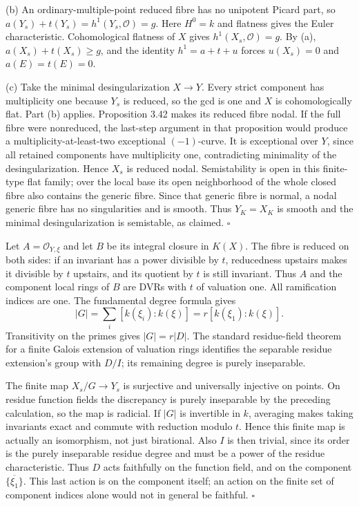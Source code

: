\documentclass[11pt]{article}
\let\chapterexercise\exercise
\renewcommand{\exercise}[2]{\Needspace{8\baselineskip}\chapterexercise{#1}{#2}}
\begin{document}
(b) An ordinary-multiple-point reduced fibre has no unipotent Picard part, so $a(Y_s)+t(Y_s)=h^1(Y_s,\mathcal O)=g$. Here $H^0=k$ and flatness gives the Euler characteristic. Cohomological flatness of $X$ gives $h^1(X_s,\mathcal O)=g$. By (a), $a(X_s)+t(X_s)\ge g$, and the identity $h^1=a+t+u$ forces $u(X_s)=0$ and $a(E)=t(E)=0$.

(c) Take the minimal desingularization $X\to Y$. Every strict component has multiplicity one because $Y_s$ is reduced, so the gcd is one and $X$ is cohomologically flat. Part (b) applies. Proposition 3.42 makes its reduced fibre nodal. If the full fibre were nonreduced, the last-step argument in that proposition would produce a multiplicity-at-least-two exceptional $(-1)$-curve. It is exceptional over $Y$, since all retained components have multiplicity one, contradicting minimality of the desingularization. Hence $X_s$ is reduced nodal. Semistability is open in this finite-type flat family; over the local base its open neighborhood of the whole closed fibre also contains the generic fibre. Since that generic fibre is normal, a nodal generic fibre has no singularities and is smooth. Thus $Y_K=X_K$ is smooth and the minimal desingularization is semistable, as claimed. \hfill$\square$

\pf Let $A=\mathcal O_{Y,\xi}$ and let $B$ be its integral closure in $K(X)$. The fibre is reduced on both sides: if an invariant has a power divisible by $t$, reducedness upstairs makes it divisible by $t$ upstairs, and its quotient by $t$ is still invariant. Thus $A$ and the component local rings of $B$ are DVRs with $t$ of valuation one. All ramification indices are one. The fundamental degree formula gives
\[ |G|=\sum_i[k(\xi_i):k(\xi)]=r[k(\xi_1):k(\xi)]. \]
Transitivity on the primes gives $|G|=r|D|$. The standard residue-field theorem for a finite Galois extension of valuation rings identifies the separable residue extension's group with $D/I$; its remaining degree is purely inseparable.

The finite map $X_s/G\to Y_s$ is surjective and universally injective on points. On residue function fields the discrepancy is purely inseparable by the preceding calculation, so the map is radicial. If $|G|$ is invertible in $k$, averaging makes taking invariants exact and commute with reduction modulo $t$. Hence this finite map is actually an isomorphism, not just birational. Also $I$ is then trivial, since its order is the purely inseparable residue degree and must be a power of the residue characteristic. Thus $D$ acts faithfully on the function field, and on the component $\overline{\{\xi_1\}}$. This last action is on the component itself; an action on the finite set of component indices alone would not in general be faithful. \hfill$\square$
\end{document}
